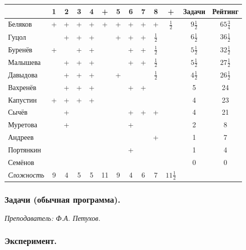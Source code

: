 \documentclass[12pt]{article}
\newlength{\h}
\newlength{\x}
\begin{document}
\begin{center}
  \begin{tabular}{|l| c|c|c|c|c| c|c|c|c|c| c|c|}
    \hline
    & 1 & 2 & 3 & 4 & + & 5 & 6 & 7 & 8 & + & Задачи & Рейтинг \\
    \hline
    Беляков & + & + & + & + & + & + & + & + & + & $\frac{1}{2}$ & $9\frac{1}{2}$ & $65\frac{3}{4}$ \\
    \hline
    Гуцол &  & + & + & + &  & + & + & + & $\frac{1}{2}$ & & $6\frac{1}{2}$ & $36\frac{1}{2}$ \\
    \hline
    Буренёв & + & & + & + &  &  & + & + & $\frac{1}{2}$ & & $5\frac{1}{2}$ & $32\frac{1}{2}$ \\
    \hline
    Малышева &  & + & + & + &  &  & + & + & $\frac{1}{2}$ & & $5\frac{1}{2}$ & $27\frac{1}{2}$ \\
    \hline
    Давыдова &  & + & + & + &  & + & & & $\frac{1}{2}$ & & $4\frac{1}{2}$ & $26\frac{1}{2}$ \\
    \hline
    Вахренёв &  & + & + & + &  &  & + & + & & & 5 & 24 \\
    \hline
    Капустин & + & + & + & + &  &  &  &  &  &  & 4 & 23 \\
    \hline
    Сычёв &  & + &  &  &  &  & + & + & + &  & 4 & 21 \\
    \hline
    Муретова &  & + &  &  &  &  & + &  &  &  & 2 & 8 \\
    \hline
    Андреев &  &  &  &  &  &  &  &  & + &  & 1 & 7 \\
    \hline
    Портянкин &  &  &  &  &  &  & + &  &  &  & 1 & 4 \\
    \hline
    Семёнов &  &  &  &  &  &  &  &  &  &  & 0 & 0 \\
    \hline
    \textit{Сложность} & 9 & 4 & 5 & 5 & 11 & 9 & 4 & 6 & 7 & $11\frac{1}{2}$ &  & \\
    \hline
  \end{tabular}
\end{center}


\subsubsection{Задачи (обычная программа).}
\label{sec:daily10pr-norm}

\textit{Преподаватель: Ф.А. Петухов.}

\subsubsection{Эксперимент.}
\label{sec:daily10exp}
\end{document}
